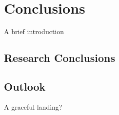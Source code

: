 \chapter{Conclusions}
\graphicspath{{conclusions/figs}}

A brief introduction

\section{Research Conclusions}
\section{Outlook}

A graceful landing?